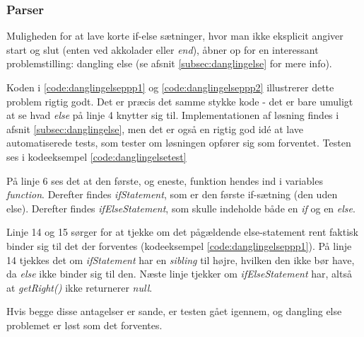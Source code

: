 \subsubsection{Parser}
\label{subsec:parser}

Muligheden for at lave korte if-else sætninger, hvor man ikke eksplicit angiver start og slut (enten ved akkolader eller \textit{end}), åbner op for en interessant problemstilling: dangling else (se afsnit \ref{subsec:danglingelse} for mere info). 



\noindent Koden i \ref{code:danglingelseppp1} og \ref{code:danglingelseppp2} illustrerer dette problem rigtig godt. Det er præcis det samme stykke kode - det er bare umuligt at se hvad \textit{else} på linje 4 knytter sig til. Implementationen af løsning findes i afsnit \ref{subsec:danglingelse}, men det er også en rigtig god idé at lave automatiserede tests, som tester om løsningen opfører sig som forventet. Testen ses i kodeeksempel \ref{code:danglingelsetest}


\noindent På linje 6 ses det at den første, og eneste, funktion hendes ind i variables \textit{function}. Derefter findes \textit{ifStatement}, som er den første if-sætning (den uden else). Derefter findes \textit{ifElseStatement}, som skulle indeholde både en \textit{if} og en \textit{else}.

Linje 14 og 15 sørger for at tjekke om det pågældende else-statement rent faktisk binder sig til det der forventes (kodeeksempel \ref{code:danglingelseppp1}). På linje 14 tjekkes det om \textit{ifStatement} har en \textit{sibling} til højre, hvilken den ikke bør have, da \textit{else} ikke binder sig til den. Næste linje tjekker om \textit{ifElseStatement} har, altså at \textit{getRight()} ikke returnerer \textit{null}. 

Hvis begge disse antagelser er sande, er testen gået igennem, og dangling else problemet er løst som det forventes.